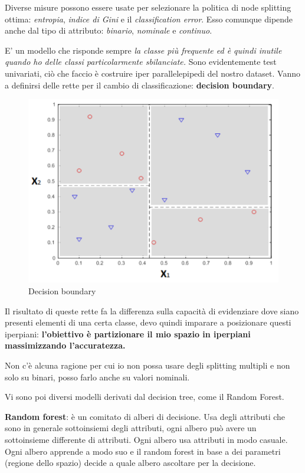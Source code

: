 Diverse misure possono essere usate per selezionare la politica di node splitting ottima: \textit{entropia}, \textit{indice di Gini} e il \textit{classification error}. Esso comunque dipende anche dal tipo di attributo: \textit{binario}, \textit{nominale} e \textit{continuo}. 

E' un modello che risponde sempre \textit{la classe più frequente ed è quindi inutile quando ho delle classi particolarmente sbilanciate.} Sono evidentemente test univariati, ciò che faccio è costruire iper parallelepipedi del nostro dataset. Vanno a definirsi delle rette per il cambio di classificazione: \textbf{decision boundary}.

\begin{figure}[H]
	\centering
	\includegraphics[height=0.5 \linewidth]{classification/pict/decision_boundary.png}
	\caption{Decision boundary}
\end{figure}

Il risultato di queste rette fa la differenza sulla capacità di evidenziare dove siano presenti elementi di una certa classe, devo quindi imparare a posizionare questi iperpiani: \textbf{l'obiettivo è partizionare il mio spazio in iperpiani massimizzando l'accuratezza.}

Non c'è alcuna ragione per cui io non possa usare degli splitting multipli e non solo su binari, posso farlo anche su valori nominali.

Vi sono poi diversi modelli derivati dal decision tree, come il Random Forest.

\textbf{Random forest}: è un comitato di alberi di decisione. Usa degli attributi che sono in generale sottoinsiemi degli attributi, ogni albero può avere un sottoinsieme differente di attributi. Ogni albero usa attributi in modo casuale. Ogni albero apprende a modo suo e il random forest in base a dei parametri (regione dello spazio) decide a quale albero ascoltare per la decisione.

